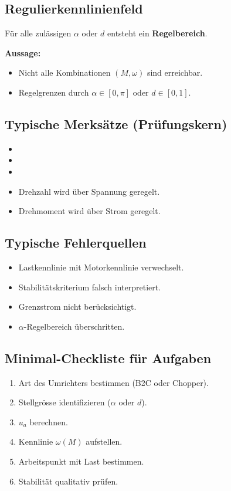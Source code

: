 
\subsection{Regulierkennlinienfeld}

Für alle zulässigen $\alpha$ oder $d$ entsteht ein \textbf{Regelbereich}.



\textbf{Aussage:}
\begin{itemize}
    \item Nicht alle Kombinationen $(M,\omega)$ sind erreichbar.
    \item Regelgrenzen durch $\alpha \in [0,\pi]$ oder $d \in [0,1]$.
\end{itemize}

\subsection{Typische Merksätze (Prüfungskern)}

\begin{itemize}
    \item {}
    \item {}
    \item {}
    \item Drehzahl wird über Spannung geregelt.
    \item Drehmoment wird über Strom geregelt.
\end{itemize}

\subsection{Typische Fehlerquellen}

\begin{itemize}
    \item Lastkennlinie mit Motorkennlinie verwechselt.
    \item Stabilitätskriterium falsch interpretiert.
    \item Grenzstrom nicht berücksichtigt.
    \item $\alpha$-Regelbereich überschritten.
\end{itemize}

\subsection{Minimal-Checkliste für Aufgaben}

\begin{enumerate}
    \item Art des Umrichters bestimmen (B2C oder Chopper).
    \item Stellgrösse identifizieren ($\alpha$ oder $d$).
    \item $u_a$ berechnen.
    \item Kennlinie $\omega(M)$ aufstellen.
    \item Arbeitspunkt mit Last bestimmen.
    \item Stabilität qualitativ prüfen.
\end{enumerate}
